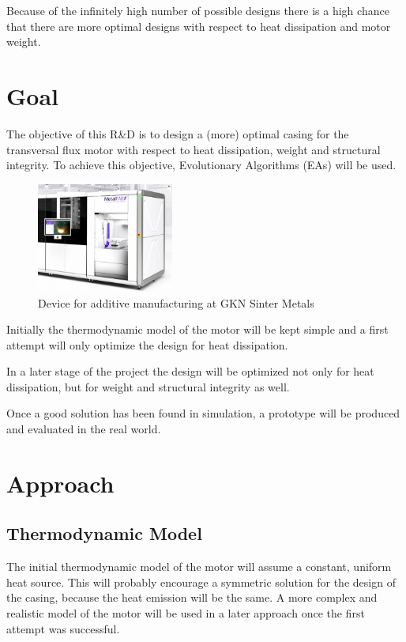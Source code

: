 \documentclass[12pt]{article}
\begin{document}
Because of the infinitely high number of possible designs there is a high chance that there are more optimal designs with respect to heat dissipation and motor weight.

\section{Goal}
The objective of this R\&D is to design a (more) optimal casing for the transversal flux motor with respect to heat dissipation, weight and structural integrity.
To achieve this objective, Evolutionary Algorithms (EAs) will be used.

\begin{figure}
	\centering
  \includegraphics[width=0.4\textwidth]{images/printer.jpg}
	\caption{Device for additive manufacturing at GKN Sinter Metals}
	\label{fig_additive}
\end{figure}


Initially the thermodynamic model of the motor will be kept simple and a first attempt will only optimize the design for heat dissipation.

In a later stage of the project the design will be optimized not only for heat dissipation, but for weight and structural integrity as well.

Once a good solution has been found in simulation, a prototype will be produced and evaluated in the real world.


\section{Approach}
\subsection{Thermodynamic Model}
The initial thermodynamic model of the motor will assume a constant, uniform heat source. 
This will probably encourage a symmetric solution for the design of the casing, because the heat emission will be the same.
A more complex and realistic model of the motor will be used in a later approach once the first attempt was successful.
\end{document}
